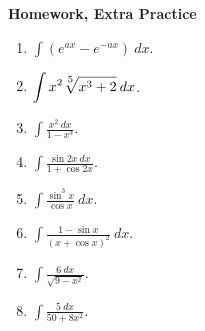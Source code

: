 \documentclass[jou]{apa6}
\begin{document}
{\large
\vspace{20pt}
{\bf Homework, Extra Practice}


\begin{enumerate}[1)]
\item ${\displaystyle \int (e^{ax} - e^{-ax})\:dx}$.
\item ${\displaystyle \int x^2 \sqrt[\leftroot{-1}\uproot{2}\scriptstyle 5]{x^3 + 2}\:dx}$.
\item ${\displaystyle \int \frac{x^2\:dx}{1 - x^3}}$.
\item ${\displaystyle \int \frac{\sin 2x\:dx}{1 + \cos 2x}}$.
\item ${\displaystyle \int \frac{\sin^3 x}{\cos x}\:dx}$.
\item ${\displaystyle \int \frac{1 - \sin x}{(x + \cos x)^2}\:dx}$.
\item ${\displaystyle \int \frac{6\:dx}{\sqrt{9 - x^2}}}$.
\item ${\displaystyle \int \frac{5\:dx}{50 + 8x^2}}$.
\end{enumerate}
}
\end{document}
